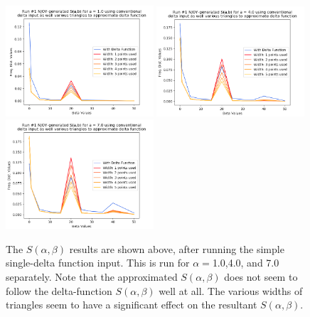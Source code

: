 \documentclass[a4paper]{article}
\begin{document}
\begin{figure}
\centering
\includegraphics[width=0.49\textwidth]{run1_sab_alpha_equals_1.png}
\includegraphics[width=0.49\textwidth]{run1_sab_alpha_equals_4.png}
\includegraphics[width=0.49\textwidth]{run1_sab_alpha_equals_7.png}
\caption{\label{fig:run2_comparing_sab_values} The $S(\alpha,\beta)$ results are shown above, after running the simple single-delta function input. This is run for $\alpha=$1.0,4.0, and 7.0 separately. Note that the approximated $S(\alpha,\beta)$ does not seem to follow the delta-function $S(\alpha,\beta)$ well at all. The various widths of triangles seem to have a significant effect on the resultant $S(\alpha,\beta)$.}
\end{figure}
\end{document}
